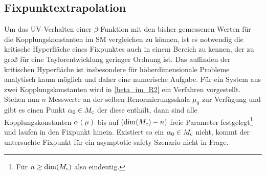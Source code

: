   \subsection{Fixpunktextrapolation}
    Um das UV-Verhalten einer $\beta$-Funktion mit den bisher gemessenen Werten für die 
    Kopplungskonstanten im SM vergleichen zu können, ist es notwendig die kritische Hyperfläche 
    eines Fixpunktes auch in einem Bereich zu kennen, der zu groß für eine Taylorentwicklung 
    geringer Ordnung ist. Das auffinden der kritischen Hyperfläche ist insbesondere für 
    höherdimensionale Probleme analytisch kaum möglich und daher eine numerische Aufgabe. Für 
    ein System aus zwei Kopplungskonstanten wird in \ref{beta_im_R2} ein Verfahren 
    vorgestellt.
    Stehen nun $n$ Messwerte an der selben Renormierungsskala 
    $\mu_0$ zur Verfügung und gibt es einen Punkt $\alpha_0\in M_\text{c}$ der diese enthält, 
    dann sind alle Kopplungskonstanten $\alpha(\mu)$ bis auf $(\dim (M_\text{c})-n)$ freie Parameter 
    festgelegt\footnote{Für $n\geq \dim(M_\text{c})$ also eindeutig.} und laufen in den 
    Fixpunkt hinein. Existiert so ein $\alpha_0\in M_\text{c}$ nicht, kommt der untersuchte Fixpunkt 
    für ein asymptotic safety Szenario nicht in Frage. 

    

  
    



      


  
  
  
  
